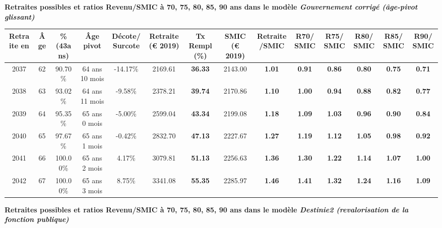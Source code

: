 \vspace{0.1cm} 
{\bf \noindent Retraites possibles et ratios Revenu/SMIC à 70, 75, 80, 85, 90 ans dans le modèle \emph{Gouvernement corrigé (âge-pivot glissant)}}  
 
\begin{adjustbox}{max width=\textwidth} 
\begin{tabular}[htb]{|c|c||c|c|c||c|c||c|c||c|c|c|c|c|} 
\hline 
 Retraite en &  Âge &  \%(43ans) &  Âge pivot &  Décote/Surcote &  Retraite (\euro{} 2019) &  Tx Rempl(\%) &  SMIC (\euro{} 2019) &  Retraite/SMIC &  R70/SMIC &  R75/SMIC &  R80/SMIC &  R85/SMIC &  R90/SMIC \\ 
\hline \hline 
 2037 &  62 &  90.70\% &  64 ans 10 mois &  -14.17\% &  2169.61 &  {\bf 36.33} &  2143.00 &  {\bf 1.01} &  {\bf {\color{red} 0.91}} &  {\bf {\color{red} 0.86}} &  {\bf {\color{red} 0.80}} &  {\bf {\color{red} 0.75}} &  {\bf {\color{red} 0.71}} \\ 
\hline 
 2038 &  63 &  93.02\% &  64 ans 11 mois &  -9.58\% &  2378.21 &  {\bf 39.74} &  2170.86 &  {\bf 1.10} &  {\bf 1.00} &  {\bf {\color{red} 0.94}} &  {\bf {\color{red} 0.88}} &  {\bf {\color{red} 0.82}} &  {\bf {\color{red} 0.77}} \\ 
\hline 
 2039 &  64 &  95.35\% &  65 ans 0 mois &  -5.00\% &  2599.04 &  {\bf 43.34} &  2199.08 &  {\bf 1.18} &  {\bf 1.09} &  {\bf 1.03} &  {\bf {\color{red} 0.96}} &  {\bf {\color{red} 0.90}} &  {\bf {\color{red} 0.84}} \\ 
\hline 
 2040 &  65 &  97.67\% &  65 ans 1 mois &  -0.42\% &  2832.70 &  {\bf 47.13} &  2227.67 &  {\bf 1.27} &  {\bf 1.19} &  {\bf 1.12} &  {\bf 1.05} &  {\bf {\color{red} 0.98}} &  {\bf {\color{red} 0.92}} \\ 
\hline 
 2041 &  66 &  100.00\% &  65 ans 2 mois &  4.17\% &  3079.81 &  {\bf 51.13} &  2256.63 &  {\bf 1.36} &  {\bf 1.30} &  {\bf 1.22} &  {\bf 1.14} &  {\bf 1.07} &  {\bf 1.00} \\ 
\hline 
 2042 &  67 &  100.00\% &  65 ans 3 mois &  8.75\% &  3341.08 &  {\bf 55.35} &  2285.97 &  {\bf 1.46} &  {\bf 1.41} &  {\bf 1.32} &  {\bf 1.24} &  {\bf 1.16} &  {\bf 1.09} \\ 
\hline 
\hline 
\end{tabular} 
\end{adjustbox} 
 
 \vspace{0.1cm} 
{\bf \noindent Retraites possibles et ratios Revenu/SMIC à 70, 75, 80, 85, 90 ans dans le modèle \emph{Destinie2 (revalorisation de la fonction publique)}}  
 
